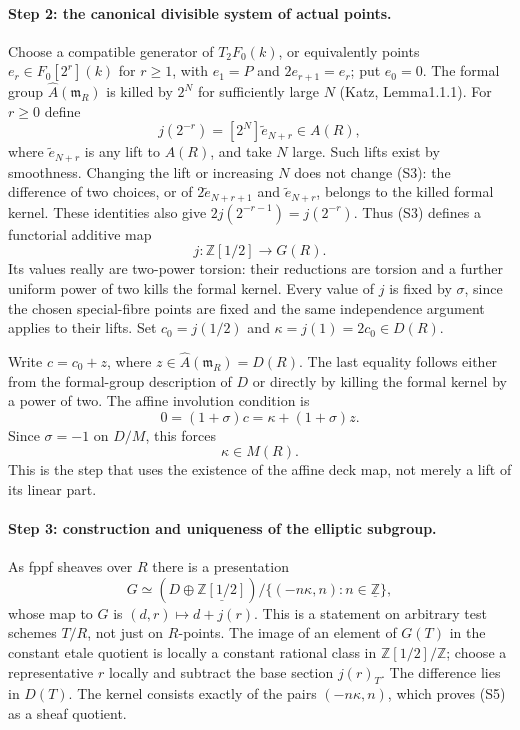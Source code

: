 \paragraph{Step 2: the canonical divisible system of actual points.}
Choose a compatible generator of $T_2F_0(k)$, or equivalently points
$e_r\in F_0[2^r](k)$ for $r\geq1$, with $e_1=P$ and
$2e_{r+1}=e_r$; put $e_0=0$. The formal group
$\widehat A(\mathfrak m_R)$ is killed by $2^N$ for sufficiently large
$N$ (Katz, Lemma1.1.1). For $r\geq0$ define
\[
 j(2^{-r})=[2^N]\widetilde e_{N+r}\in A(R),             \tag{S3}
\]
where $\widetilde e_{N+r}$ is any lift to $A(R)$, and take $N$ large.
Such lifts exist by smoothness. Changing the lift or increasing $N$
does not change (S3): the difference of two choices, or of
$2\widetilde e_{N+r+1}$ and $\widetilde e_{N+r}$, belongs to the
killed formal kernel. These identities also give
$2j(2^{-r-1})=j(2^{-r})$. Thus (S3) defines a functorial additive map
\[
 j:\mathbb Z[1/2]\longrightarrow G(R).
\]
Its values really are two-power torsion: their reductions are torsion
and a further uniform power of two kills the formal kernel. Every
value of $j$ is fixed by $\sigma$, since the chosen special-fibre
points are fixed and the same independence argument applies to their
lifts. Set $c_0=j(1/2)$ and $\kappa=j(1)=2c_0\in D(R)$.

Write $c=c_0+z$, where $z\in\widehat A(\mathfrak m_R)=D(R)$.
The last equality follows either from the formal-group description
of $D$ or directly by killing the formal kernel by a power of two.
The affine involution condition is
\[
 0=(1+\sigma)c=\kappa+(1+\sigma)z.
\]
Since $\sigma=-1$ on $D/M$, this forces
\[
                         \kappa\in M(R).                \tag{S4}
\]
This is the step that uses the existence of the affine deck map, not
merely a lift of its linear part.

\paragraph{Step 3: construction and uniqueness of the elliptic subgroup.}
As fppf sheaves over $R$ there is a presentation
\[
 G\simeq
 (D\oplus\underline{\mathbb Z[1/2]})/
       \{(-n\kappa,n):n\in\underline{\mathbb Z}\},       \tag{S5}
\]
whose map to $G$ is $(d,r)\mapsto d+j(r)$. This is a statement on
arbitrary test schemes $T/R$, not just on $R$-points. The image of
an element of $G(T)$ in the constant etale quotient is locally a
constant rational class in $\mathbb Z[1/2]/\mathbb Z$; choose a
representative $r$ locally and subtract the base section $j(r)_T$.
The difference lies in $D(T)$. The kernel consists exactly of the
pairs $(-n\kappa,n)$, which proves (S5) as a sheaf quotient.

